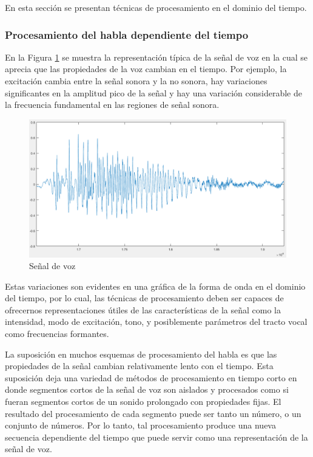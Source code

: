 En esta sección se presentan técnicas de procesamiento en el dominio del tiempo.

\subsubsection{Procesamiento del habla dependiente del tiempo}

En la Figura \ref{fig:vozTipica} se muestra la representación típica de la señal de voz en la cual se aprecia que las propiedades de la voz cambian en el tiempo. Por ejemplo, la excitación cambia entre la señal sonora y la no sonora, hay variaciones significantes en la amplitud pico de la señal y hay una variación considerable de la frecuencia fundamental en las regiones de señal sonora.

\begin{figure}[H]
	\centering
	\includegraphics[width=1\linewidth]{figures/vozTipica}
	\caption{Señal de voz}
	\label{fig:vozTipica}
\end{figure}

Estas variaciones son evidentes en una gráfica de la forma de onda en el dominio del tiempo, por lo cual, las técnicas de procesamiento deben ser capaces de ofrecernos representaciones útiles de las características de la señal como la intensidad, modo de excitación, tono, y posiblemente parámetros del tracto vocal como frecuencias formantes.

La suposición en muchos esquemas de procesamiento del habla es que las propiedades de la señal cambian relativamente lento con el tiempo. Esta suposición deja una variedad de métodos de procesamiento en tiempo corto en donde segmentos cortos de la señal de voz son aislados y procesados como si fueran segmentos cortos de un sonido prolongado con propiedades fijas. El resultado del procesamiento de cada segmento puede ser tanto un número, o un conjunto de números. Por lo tanto, tal procesamiento produce una nueva secuencia dependiente del tiempo que puede servir como una representación de la señal de voz.

